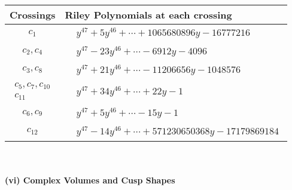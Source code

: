 \documentclass[1p]{elsarticle_modified}
\theoremstyle{definition}
\begin{document}
\begin{tabular}{m{50pt}|m{274pt}}
Crossings & \hspace{64pt}Riley Polynomials at each crossing \\
\hline $$\begin{aligned}c_{1}\end{aligned}$$&$\begin{aligned}
&y^{47}+5 y^{46}+\cdots+1065680896 y-16777216
\end{aligned}$\\
\hline $$\begin{aligned}c_{2},c_{4}\end{aligned}$$&$\begin{aligned}
&y^{47}-23 y^{46}+\cdots-6912 y-4096
\end{aligned}$\\
\hline $$\begin{aligned}c_{3},c_{8}\end{aligned}$$&$\begin{aligned}
&y^{47}+21 y^{46}+\cdots-11206656 y-1048576
\end{aligned}$\\
\hline $$\begin{aligned}c_{5},c_{7},c_{10}\\c_{11}\end{aligned}$$&$\begin{aligned}
&y^{47}+34 y^{46}+\cdots+22 y-1
\end{aligned}$\\
\hline $$\begin{aligned}c_{6},c_{9}\end{aligned}$$&$\begin{aligned}
&y^{47}+5 y^{46}+\cdots-15 y-1
\end{aligned}$\\
\hline $$\begin{aligned}c_{12}\end{aligned}$$&$\begin{aligned}
&y^{47}-14 y^{46}+\cdots+571230650368 y-17179869184
\end{aligned}$\\
\hline
\end{tabular}\\~\\
\newpage\flushleft \textbf{(vi) Complex Volumes and Cusp Shapes}
\end{document}
